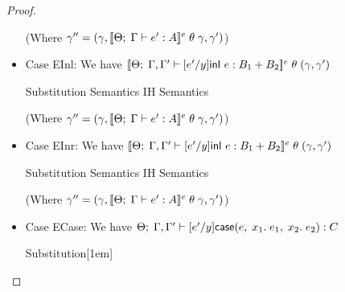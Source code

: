 \begin{proof}
\begin{itemize}
  (Where $\gamma'' = (\gamma, [\![{{\Theta};\;{\Gamma} \vdash {e'} : {A}}]\!]^e\;\theta\;\gamma, \gamma')$)

\item Case EInl: We have $[\![{{\Theta};\;{\Gamma, \Gamma'} \vdash {[e'/y]\mbox{\textsf{{inl }}}e} : {B_1 + B_2}}]\!]^e\;\theta\;(\gamma, \gamma')$

  \begin{eqnproof}
          {Substitution}
          {Semantics}
          {IH}
          {Semantics}
  \end{eqnproof}

  (Where $\gamma'' = (\gamma, [\![{{\Theta};\;{\Gamma} \vdash {e'} : {A}}]\!]^e\;\theta\;\gamma, \gamma')$)


\item Case EInr: We have $[\![{{\Theta};\;{\Gamma, \Gamma'} \vdash {[e'/y]\mbox{\textsf{{inl }}}e} : {B_1 + B_2}}]\!]^e\;\theta\;(\gamma, \gamma')$

  \begin{eqnproof}
          {Substitution}
          {Semantics}
          {IH}
          {Semantics}
  \end{eqnproof}

  (Where $\gamma'' = (\gamma, [\![{{\Theta};\;{\Gamma} \vdash {e'} : {A}}]\!]^e\;\theta\;\gamma, \gamma')$)

\item Case ECase: We have ${\Theta};\;{\Gamma,\Gamma'} \vdash {[e'/y]\mbox{\textsf{{case}}}(e,\; {x_1}.\; e_1,\; {x_2}.\; e_2)} : {C}$

  \begin{eqnproof}
          {Substitution}[1em]


\end{eqnproof}
\end{itemize}
\end{proof}
